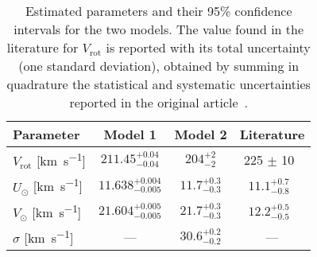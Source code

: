 \begin{table}[H]
    \centering

    \begin{tabular}{l c c | c}
        \hline
        Parameter & Model 1 & Model 2 & Literature\\
        \hline
        $V_{\text{rot}}$ [\unit{\kilo\meter\per\second}] & $211.45_{-0.04}^{+0.04}$ & $204_{-2}^{+2}$ & 225 $\pm$ 10~\cite{GalacticKinematics} \\
        $U_{\odot}$ [\unit{\kilo\meter\per\second}] & $11.638_{-0.005}^{+0.004}$ & $11.7_{-0.3}^{+0.3}$ & $11.1_{-0.8}^{+0.7}$~\cite{LocalKinematics} \\
        $V_{\odot}$ [\unit{\kilo\meter\per\second}] & $21.604_{-0.005}^{+0.005}$ & $21.7_{-0.3}^{+0.3}$ & $12.2^{+0.5}
        _{-0.5}$~\cite{LocalKinematics} \\
        $\sigma$ [\unit{\kilo\meter\per\second}] & --- & $30.6_{-0.2}^{+0.2}$ & --- \\
        \hline
    \end{tabular}
    \caption{Estimated parameters and their 95\% confidence intervals for the two models. The value found in the literature for $V_{\text{rot}}$ is reported with its total uncertainty (one standard deviation), obtained by summing in quadrature the statistical and systematic uncertainties reported in the original article~\cite{GalacticKinematics}.}
    \label{tab:parameter_estimates}
\end{table}

